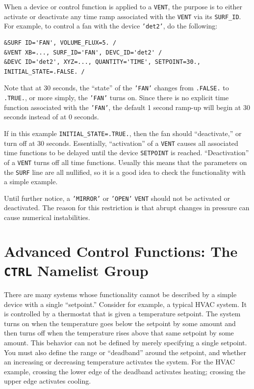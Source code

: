 \documentclass[11pt]{book}
\newcommand{\ct}{\tt\small}
\begin{document}
When a device or control function is applied to a {\ct VENT}, the purpose is to either activate or deactivate any time ramp associated with
the {\ct VENT} via its {\ct SURF\_ID}. For example, to control a fan with the device {\ct 'det2'}, do the following:

\footnotesize
\begin{verbatim}
&SURF ID='FAN', VOLUME_FLUX=5. /
&VENT XB=..., SURF_ID='FAN', DEVC_ID='det2' /
&DEVC ID='det2', XYZ=..., QUANTITY='TIME', SETPOINT=30., INITIAL_STATE=.FALSE. /
\end{verbatim}
\normalsize

\noindent
Note that at 30 seconds, the ``state'' of the {\ct 'FAN'} changes from {\ct .FALSE.} to {\ct .TRUE.}, or more simply, the {\ct 'FAN'} turns on. Since there
is no explicit time function associated with the {\ct 'FAN'}, the default 1 second ramp-up will begin at 30 seconds instead of at 0 seconds.

If in this example {\ct INITIAL\_STATE=.TRUE.}, then the fan should ``deactivate,'' or turn off at 30 seconds. Essentially, ``activation'' of a {\ct VENT} causes all associated
time functions to be delayed until the device {\ct SETPOINT} is reached. ``Deactivation'' of a {\ct VENT} turns off all time functions. Usually this means
that the parameters on the {\ct SURF} line are all nullified, so it is a good idea to check the functionality with a simple example.


\begin{warning}
Until further notice, a {\ct 'MIRROR'} or {\ct 'OPEN'} {\ct VENT} should not be activated or deactivated.
The reason for this restriction is that abrupt changes in pressure can cause numerical instabilities.
\end{warning}



\clearpage

\section{Advanced Control Functions: The \texorpdfstring{{\tt CTRL}}{CTRL} Namelist Group}
\label{info:CTRL} 

There are many systems whose functionality cannot be described by a simple device with a single ``setpoint.''
Consider for example, a typical HVAC system.  It is controlled by a thermostat that is given a temperature setpoint.
The system turns on when the temperature goes below the setpoint by some
amount and then turns off when the temperature rises above that same setpoint by some amount.
This behavior can not be defined by merely specifying a single setpoint.
You must also define the range or ``deadband'' around the setpoint, and whether an
increasing or decreasing temperature activates the system.  For the HVAC example, crossing the
lower edge of the deadband activates heating; crossing the upper edge activates cooling.
\end{document}
